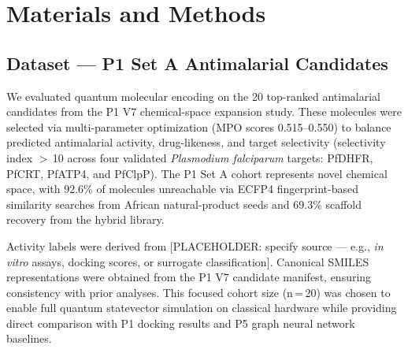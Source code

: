 %

\section{Materials and Methods}

\subsection{Dataset — P1 Set A Antimalarial Candidates}
\label{sec:methods:dataset}

We evaluated quantum molecular encoding on the 20 top-ranked antimalarial candidates from the P1 V7 chemical-space expansion study.\cite{Sao2026P1ChemSpace} These molecules were selected via multi-parameter optimization (MPO scores 0.515--0.550) to balance predicted antimalarial activity, drug-likeness, and target selectivity (selectivity index $>$\,10 across four validated \textit{Plasmodium falciparum} targets: PfDHFR, PfCRT, PfATP4, and PfClpP). The P1 Set A cohort represents novel chemical space, with 92.6\% of molecules unreachable via ECFP4 fingerprint-based similarity searches from African natural-product seeds and 69.3\% scaffold recovery from the hybrid library.\cite{Sao2026P1ChemSpace}

Activity labels were derived from [PLACEHOLDER: specify source — e.g., \textit{in vitro} assays, docking scores, or surrogate classification]. Canonical SMILES representations were obtained from the P1 V7 candidate manifest, ensuring consistency with prior analyses.\cite{Sao2026P1ChemSpace} This focused cohort size (n\,=\,20) was chosen to enable full quantum statevector simulation on classical hardware while providing direct comparison with P1 docking results\cite{Sao2026P1ChemSpace} and P5 graph neural network baselines.\cite{Sao2026P5GraphLearning}

